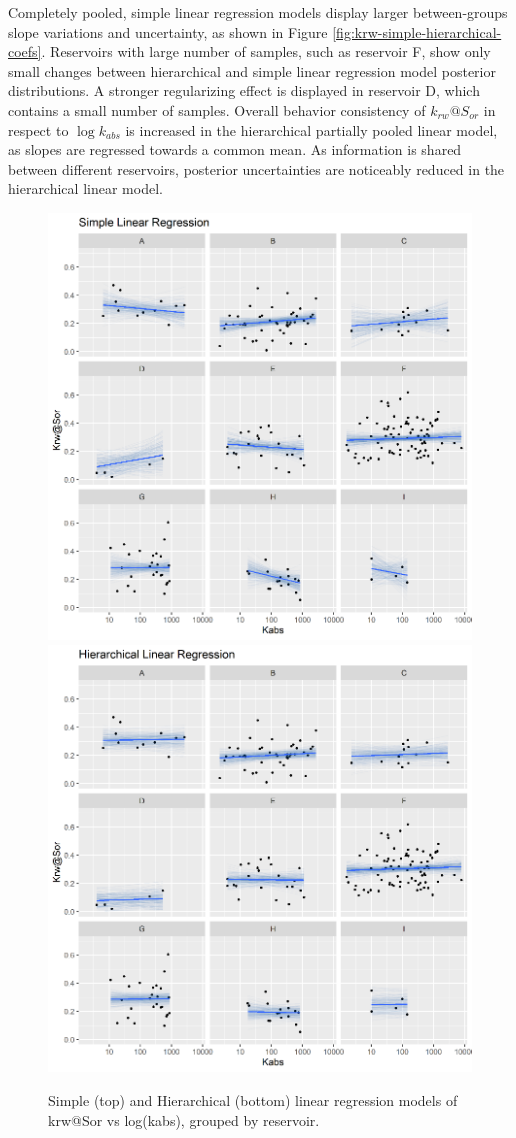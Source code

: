 \documentclass[english,msc,numbers]{coppe}
\begin{document}
  Completely pooled, simple linear regression models display larger between-groups slope variations and uncertainty, as shown in Figure \ref{fig:krw-simple-hierarchical-coefs}. Reservoirs with large number of samples, such as reservoir F, show only small changes between hierarchical and simple linear regression model posterior distributions. A stronger regularizing effect is displayed in reservoir D, which contains a small number of samples. Overall behavior consistency of \(k_{rw}@S_{or}\) in respect to \(\log{k_{abs}}\) is increased in the hierarchical partially pooled linear model, as slopes are regressed towards a common mean. As information is shared between different reservoirs, posterior uncertainties are noticeably reduced in the hierarchical linear model.
  \begin{figure}
  
  {\centering \includegraphics[width=0.75\linewidth]{figure/4-14-krw-simple} \includegraphics[width=0.75\linewidth]{figure/4-14-krw-hierarchical} 
  
  }
  
  \caption{Simple (top) and Hierarchical (bottom) linear regression models of krw@Sor vs log(kabs), grouped by reservoir.}\label{fig:krw-simple-hierarchical}
  \end{figure}
\end{document}

